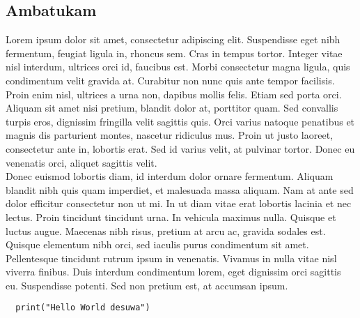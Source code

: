 \documentclass[a4paper, 12pt]{article}
\begin{document}
\subsection{Ambatukam}
Lorem ipsum dolor sit amet, consectetur adipiscing elit. Suspendisse eget nibh fermentum, feugiat ligula in, rhoncus sem. Cras in tempus tortor. Integer vitae nisl interdum, ultrices orci id, faucibus est. Morbi consectetur magna ligula, quis condimentum velit gravida at. Curabitur non nunc quis ante tempor facilisis. Proin enim nisl, ultrices a urna non, dapibus mollis felis. Etiam sed porta orci. Aliquam sit amet nisi pretium, blandit dolor at, porttitor quam. Sed convallis turpis eros, dignissim fringilla velit sagittis quis. Orci varius natoque penatibus et magnis dis parturient montes, nascetur ridiculus mus. Proin ut justo laoreet, consectetur ante in, lobortis erat. Sed id varius velit, at pulvinar tortor. Donec eu venenatis orci, aliquet sagittis velit. \\
\newline
Donec euismod lobortis diam, id interdum dolor ornare fermentum. Aliquam blandit nibh quis quam imperdiet, et malesuada massa aliquam. Nam at ante sed dolor efficitur consectetur non ut mi. In ut diam vitae erat lobortis lacinia et nec lectus. Proin tincidunt tincidunt urna. In vehicula maximus nulla. Quisque et luctus augue. Maecenas nibh risus, pretium at arcu ac, gravida sodales est. Quisque elementum nibh orci, sed iaculis purus condimentum sit amet. Pellentesque tincidunt rutrum ipsum in venenatis. Vivamus in nulla vitae nisl viverra finibus. Duis interdum condimentum lorem, eget dignissim orci sagittis eu. Suspendisse potenti. Sed non pretium est, at accumsan ipsum.
\lstset{language=python}
\begin{lstlisting}
  print("Hello World desuwa")
\end{lstlisting}
\end{document}
